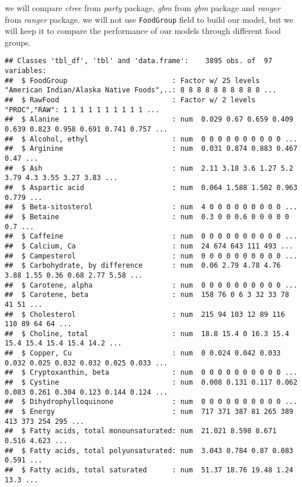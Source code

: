 \documentclass[]{article}
\begin{document}
we will compare \emph{ctree} from \emph{party} package, \emph{gbm} from
\emph{gbm} package and \emph{ranger} from \emph{ranger} package. we will
not use \texttt{FoodGroup} field to build our model, but we will keep it
to compare the performance of our models through different food groups.

\begin{verbatim}
## Classes 'tbl_df', 'tbl' and 'data.frame':    3895 obs. of  97 variables:
##  $ FoodGroup                         : Factor w/ 25 levels "American Indian/Alaska Native Foods",..: 8 8 8 8 8 8 8 8 8 8 ...
##  $ RawFood                           : Factor w/ 2 levels "PROC","RAW": 1 1 1 1 1 1 1 1 1 1 ...
##  $ Alanine                           : num  0.029 0.67 0.659 0.409 0.639 0.823 0.958 0.691 0.741 0.757 ...
##  $ Alcohol, ethyl                    : num  0 0 0 0 0 0 0 0 0 0 ...
##  $ Arginine                          : num  0.031 0.874 0.883 0.467 0.47 ...
##  $ Ash                               : num  2.11 3.18 3.6 1.27 5.2 3.79 4.3 3.55 3.27 3.83 ...
##  $ Aspartic acid                     : num  0.064 1.588 1.502 0.963 0.779 ...
##  $ Beta-sitosterol                   : num  4 0 0 0 0 0 0 0 0 0 ...
##  $ Betaine                           : num  0.3 0 0 0.6 0 0 0 0 0 0.7 ...
##  $ Caffeine                          : num  0 0 0 0 0 0 0 0 0 0 ...
##  $ Calcium, Ca                       : num  24 674 643 111 493 ...
##  $ Campesterol                       : num  0 0 0 0 0 0 0 0 0 0 ...
##  $ Carbohydrate, by difference       : num  0.06 2.79 4.78 4.76 3.88 1.55 0.36 0.68 2.77 5.58 ...
##  $ Carotene, alpha                   : num  0 0 0 0 0 0 0 0 0 0 ...
##  $ Carotene, beta                    : num  158 76 0 6 3 32 33 78 41 51 ...
##  $ Cholesterol                       : num  215 94 103 12 89 116 110 89 64 64 ...
##  $ Choline, total                    : num  18.8 15.4 0 16.3 15.4 15.4 15.4 15.4 15.4 14.2 ...
##  $ Copper, Cu                        : num  0 0.024 0.042 0.033 0.032 0.025 0.032 0.032 0.025 0.033 ...
##  $ Cryptoxanthin, beta               : num  0 0 0 0 0 0 0 0 0 0 ...
##  $ Cystine                           : num  0.008 0.131 0.117 0.062 0.083 0.261 0.304 0.123 0.144 0.124 ...
##  $ Dihydrophylloquinone              : num  0 0 0 0 0 0 0 0 0 0 ...
##  $ Energy                            : num  717 371 387 81 265 389 413 373 254 295 ...
##  $ Fatty acids, total monounsaturated: num  21.021 8.598 8.671 0.516 4.623 ...
##  $ Fatty acids, total polyunsaturated: num  3.043 0.784 0.87 0.083 0.591 ...
##  $ Fatty acids, total saturated      : num  51.37 18.76 19.48 1.24 13.3 ...

\end{verbatim}
\end{document}
